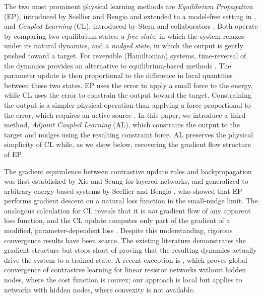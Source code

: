 \documentclass{siamart}
\begin{document}
The two most prominent physical learning methods are \emph{Equilibrium Propagation} (EP), introduced by Scellier and Bengio \cite{scellier2017equilibrium} and extended to a model-free setting in \cite{scellier2022agnostic}, and \emph{Coupled Learning} (CL), introduced by Stern and collaborators \cite{stern2021learning}. Both operate by comparing two equilibrium states: a \emph{free state}, in which the system relaxes under its natural dynamics, and a \emph{nudged state}, in which the output is gently pushed toward a target. For reversible (Hamiltonian) systems, time-reversal of the dynamics provides an alternative to equilibrium-based methods \cite{lopezpastor2023selflearning}. The parameter update is then proportional to the difference in local quantities between these two states. EP uses the error to apply a small force to the energy, while CL uses the error to constrain the output toward the target. Constraining the output is a simpler physical operation than applying a force proportional to the error, which requires an active source \cite{stern2021learning}. In this paper, we introduce a third method, \emph{Adjoint Coupled Learning} (AL), which constrains the output to the target and nudges using the resulting constraint force. AL preserves the physical simplicity of CL while, as we show below, recovering the gradient flow structure of EP.

The gradient equivalence between contrastive update rules and backpropagation was first established by Xie and Seung \cite{xie2003equivalence} for layered networks, and generalized to arbitrary energy-based systems by Scellier and Bengio \cite{scellier2017equilibrium}, who showed that EP performs gradient descent on a natural loss function in the small-nudge limit. The analogous calculation for CL reveals that it is \emph{not} gradient flow of any apparent loss function, and the CL update computes only part of the gradient of a modified, parameter-dependent loss \cite{stern2021learning}. Despite this understanding, rigorous convergence results have been scarce. The existing literature demonstrates the gradient structure but stops short of proving that the resulting dynamics actually drive the system to a trained state. A recent exception is \cite{huijzer2026convergence}, which proves global convergence of contrastive learning for linear resistor networks without hidden nodes, where the cost function is convex; our approach is local but applies to networks with hidden nodes, where convexity is not available.
\end{document}
